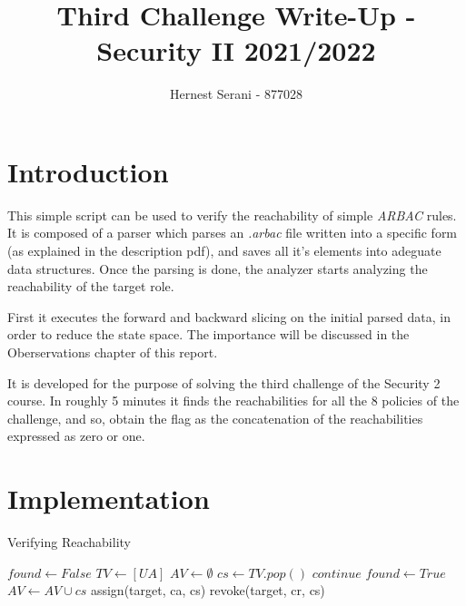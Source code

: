 \documentclass[12pt]{article}
\title{Third Challenge Write-Up - Security II 2021/2022}
\author{Hernest Serani - 877028}
\begin{document}
\maketitle

\part*{Introduction}
This simple script can be used to verify the reachability of simple {\it ARBAC} rules.
It is composed of a parser which parses an {\it .arbac} file written into a specific form (as explained
in the description pdf), and saves all it's elements into adeguate data structures.
Once the parsing is done, the analyzer starts analyzing the reachability of the target role.

First it executes the forward and backward slicing on the initial parsed data, in order to reduce the state space.
The importance will be discussed in the Oberservations chapter of this report.

It is developed for the purpose of solving the third challenge of the Security 2 course.
In roughly 5 minutes it finds the reachabilities for all the 8 policies of the challenge, and so,
obtain the flag as the concatenation of the reachabilities expressed as zero or one.

\part*{Implementation}

\begin{algorithm}
\caption{Verifying Reachability}\label{alg:cap}
\begin{algorithmic}
\State $found \gets False$
\State $TV \gets [UA]$ 
\State $AV \gets \emptyset$ 
    \State $ cs \gets TV.pop()$
     
        \State $continue$
    \EndIf
     
        \State $found \gets True$
    \EndIf
    \State $AV \gets AV \cup cs$
                \State assign(target, ca, cs) 
            \EndFor
        \EndFor
    \EndFor
                \State revoke(target, cr, cs) 
            \EndFor
        \EndFor
    \EndFor
\EndWhile
\end{algorithmic}
\end{algorithm}
\end{document}

